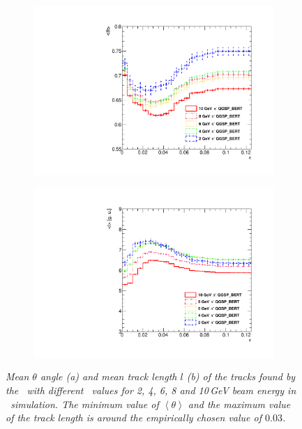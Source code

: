 \begin{appendices}
	\begin{figure}[H]
		\centering
		\begin{subfigure}{0.5\textwidth}
			\centering
			\includegraphics[width=.90\linewidth]{ECAL/plots/sys-theta.pdf}
			\caption{\label{fig:thetaepsilonsys} }
		\end{subfigure}%
		\begin{subfigure}{0.5\textwidth}
			\centering
			\includegraphics[width=.90\linewidth]{ECAL/plots/sys-l.pdf}
			\caption{\label{fig:lepsilonsys} }
		\end{subfigure}
		\caption{\label{fig:syslthetaexample} \sl Mean $\theta$ angle (a) and mean track length $l$ (b) of the tracks found by the \tfa\ with different \ep\ values for 2, 4, 6, 8 and 10\,GeV beam energy in \qgsp\ simulation. The minimum value of $\left<\theta\right>$ and the maximum value of the track length is around the empirically chosen value of $0.03$. }
	\end{figure}
	
\end{appendices}
